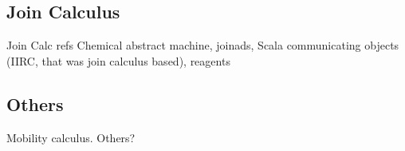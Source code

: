 \subsection{Join Calculus}

\begin{anfxwarning}{Join Calc refs}
Chemical abstract machine, joinads, Scala communicating objects (IIRC, that was join calculus based), reagents
\end{anfxwarning}

\subsection{Others}
Mobility calculus.  Others?


